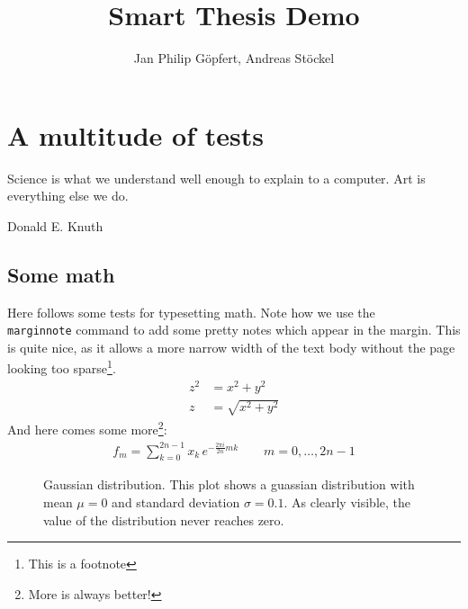\documentclass[a4paper,11pt]{memoir}
\title{Smart Thesis Demo}
\author{Jan Philip Göpfert, Andreas Stöckel}
\begin{document}
\frontmatter

\begin{titlingpage}
  \maketitle
\end{titlingpage}

\tableofcontents

\mainmatter

\chapter{A multitude of tests}

\epigraph{Science is what we understand well enough to explain to a computer. Art is everything else we do.}{Donald E. Knuth}

\blindtext

\section{Some math}

Here follows some tests for typesetting math. Note how we use the \texttt{\\marginnote} command to add some pretty notes which appear in the margin. This is quite nice, as it allows a more narrow width of the text body without the page looking too sparse\footnote{This is a footnote}.
\begin{align}
  z^2 &= x^2 + y^2 \\
  z &= \sqrt{x^2 + y^2}
\end{align}
And here comes some more\footnote{More is always better!}:
\begin{align}
	f_m =  \sum_{k=0}^{2n-1} x_k \, e^{-\frac{2\pi i}{2n} mk } \label{eqn:dft}
\qquad
m = 0,\dotsc,2n-1
\end{align}

\begin{figure}
	\centering %
	\caption{Gaussian distribution. This plot shows a guassian distribution with mean $\mu = 0$ and standard deviation $\sigma = 0.1$. As clearly visible, the value of the distribution never reaches zero.}
	\label{fig:gaussian_distr}
\end{figure}
\end{document}
